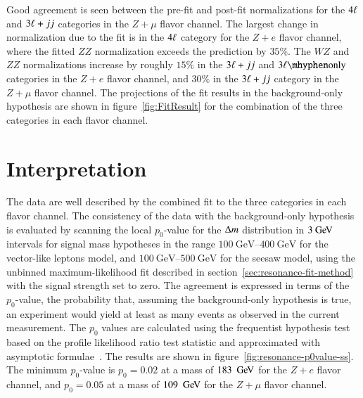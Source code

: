 Good agreement is seen between the pre-fit and post-fit normalizations for the $4\ell$ and $3\ell+jj$ categories in the $Z+\mu$ flavor channel. The largest change in normalization due to the fit is in the $4\ell$ category for the $Z+e$ flavor channel, where the fitted $ZZ$ normalization exceeds the prediction by $35\%$. The $WZ$ and $ZZ$ normalizations increase by roughly $15\%$ in the $3\ell+jj$ and $\threelo$ categories in the $Z+e$ flavor channel, and $30\%$ in the $3\ell+jj$ category in the $Z+\mu$ flavor channel. The projections of the fit results in the background-only hypothesis are shown in figure~\ref{fig:FitResult} for the combination of the three categories in each flavor channel.




\section{Interpretation}\label{sec:resonance-interpretation}
The data are well described by the combined fit to the three categories in each flavor channel. The consistency of the data with the background-only hypothesis is evaluated by scanning the local $p_0$-value for the $\Delta m$ distribution in $3 \GeV$ intervals for signal mass hypotheses in the range $\SIrange[range-phrase=-]{100}{400}{\giga\electronvolt}$ for the vector-like leptons model, and $\SIrange[range-phrase=-]{100}{500}{\giga\electronvolt}$ for the seesaw model, using the unbinned maximum-likelihood fit described in section~\ref{sec:resonance-fit-method} with the signal strength set to zero. The agreement is expressed in terms of the $p_0$-value, the probability that, assuming the background-only hypothesis is true, an experiment would yield at least as many events as observed in the current measurement. The $p_0$ values are calculated using the frequentist hypothesis test based on the profile likelihood ratio test statistic and approximated with asymptotic formulae~\cite{asimov}. The results are shown in figure~\ref{fig:resonance-p0value-ss}. The minimum $p_0$-value is $p_0=0.02$ at a mass of $183~\GeV$ for the $Z+e$ flavor channel, and $p_0=0.05$ at a mass of $109~\GeV$ for the $Z+\mu$ flavor channel.

